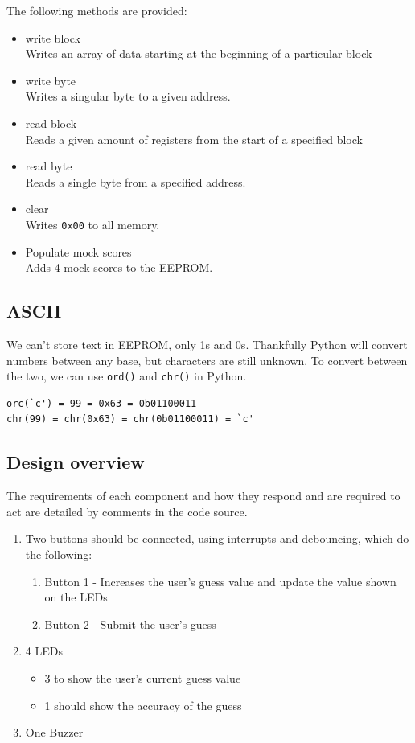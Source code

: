 The following methods are provided:
\begin{itemize}
    \item write block\\
    Writes an array of data starting at the beginning of a particular block
    \item write byte\\
    Writes a singular byte to a given address.
    \item read block\\
    Reads a given amount of registers from the start of a specified block
    \item read byte\\
    Reads a single byte from a specified address.
    \item clear\\
    Writes \verb|0x00| to all memory.
    \item Populate mock scores\\
    Adds 4 mock scores to the EEPROM.
\end{itemize}


\subsection{ASCII}
We can't store text in EEPROM, only 1s and 0s. Thankfully Python will convert numbers between any base, but characters are still unknown. To convert between the two, we can use \verb|ord()| and \verb|chr()| in Python.
\begin{verbatim}
orc(`c') = 99 = 0x63 = 0b01100011
chr(99) = chr(0x63) = chr(0b01100011) = `c'    
\end{verbatim}


\subsection{Design overview}
The requirements of each component and how they respond and are required to act are detailed by comments in the code source.
\begin{enumerate}
    \item Two buttons should be connected, using interrupts and  \href{https://raspberrypi.stackexchange.com/questions/8544/gpio-interrupt-debounce}{debouncing}, which do the following:
        \begin{enumerate}
            \item Button 1 - Increases the user's guess value and update the value shown on the LEDs
            \item Button 2 - Submit the user's guess
        \end{enumerate}
    \item 4 LEDs
    \begin{itemize}
        \item 3 to show the user's current guess value
        \item 1 should show the accuracy of the guess
    \end{itemize}
    \item One Buzzer

\end{enumerate}

